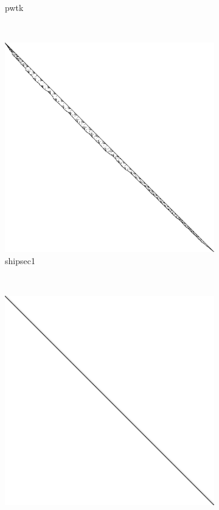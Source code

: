 \begin{figure}
\begin{multicols}{4}
\begin{subfigure}{\linewidth}
\caption{pwtk}
\end{subfigure}~%
\end{multicols}
\begin{multicols}{4}
\begin{subfigure}{\linewidth}
\includegraphics[width=\linewidth]{images/shipsec1}
\caption{shipsec1}
\end{subfigure}~%
\begin{subfigure}{\linewidth}
\includegraphics[width=\linewidth]{images/mac_econ_fwd500}

\end{subfigure}
\end{multicols}
\end{figure}
